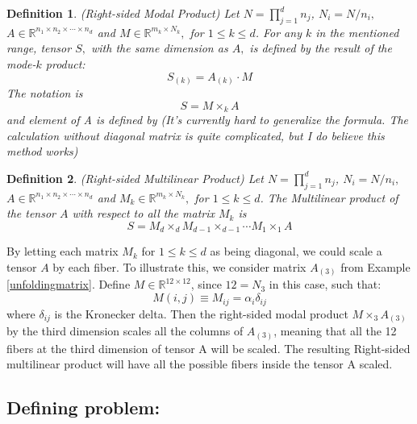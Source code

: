 \documentclass{article}
\newtheorem{definition}{Definition}[section]
\begin{document}
\begin{definition}{(Right-sided Modal Product)}
Let $N = \prod^d_{j=1} n_j$, $N_i = N/n_i,$ $A \in \mathbb{R}^{n_1 \times n_2 \times \cdots \times n_d}$ and $M\in \mathbb{R}^{m_k \times N_k},$ for $1\leq k \leq d$. For any $k$ in the mentioned range, tensor $S,$ with the same dimension as $A,$ is defined by the result of the mode-$k$ product:
$$S_{(k)} = A_{(k)} \cdot M$$
The notation is
$$S = M \times_{k} A$$
and element of A is defined by (It's currently hard to generalize the formula. The calculation without diagonal matrix is quite complicated, but I do believe this method works)

\end{definition}{}

\begin{definition}{(Right-sided Multilinear Product)}
Let $N = \prod^d_{j=1} n_j$, $N_i = N/n_i,$ $A \in \mathbb{R}^{n_1 \times n_2 \times \cdots \times n_d}$ and $M_k \in \mathbb{R}^{m_k \times N_k},$ for $1\leq k \leq d$. The Multilinear product of the tensor $A$ with respect to all the matrix $M_k$ is 
$$S =  M_d\times_{d} M_{d-1} \times_{d-1}  \cdots M_1 \times_{1} A$$
\end{definition}{}

By letting each matrix $M_k$ for $1 \leq k \leq d$ as being diagonal, we could scale a tensor $A$ by each fiber. To illustrate this, we consider matrix $A_{(3)}$ from Example \ref{unfoldingmatrix}. Define $M \in \mathbb{R}^{12\times 12}$, since $12 = N_3$ in this case, such that:
$$M(i,j) \equiv M_{ij}  = \alpha_i\delta_{ij}$$
where $\delta_{ij}$ is the Kronecker delta. Then the right-sided modal product $M\times_3 A_{(3)}$ by the third dimension scales all the columns of $A_{(3)}$, meaning that all the 12 fibers at the third dimension of tensor A will be scaled. The resulting Right-sided multilinear product will have all the possible fibers inside the tensor A scaled.

\subsection{Defining problem:}
\end{document}
